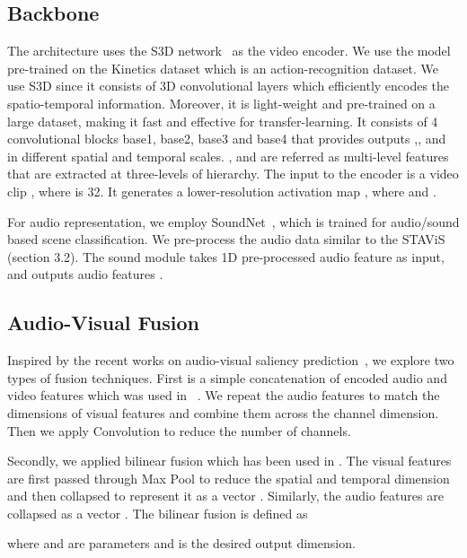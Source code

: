 \documentclass[letterpaper, 10 pt, conference]{ieeeconf}  \usepackage{times}
\begin{document}
\subsection{Backbone}
The architecture uses the S3D network~\cite{xie2018rethinking} as the video encoder. We use the model pre-trained on the Kinetics dataset which is an action-recognition dataset. We use S3D since it consists of 3D convolutional layers which efficiently encodes the spatio-temporal information. Moreover, it is light-weight and pre-trained on a large dataset, making it fast and effective for transfer-learning. It consists of 4 convolutional blocks base1, base2, base3 and base4 that provides outputs ,, and  in different spatial and temporal scales. , and  are referred as multi-level features that are extracted at three-levels of hierarchy. The input to the encoder is a video clip , where  is 32. It generates a lower-resolution activation map , where  and .

For audio representation, we employ SoundNet~\cite{aytar2016soundnet}, which is trained for audio/sound based scene classification. We pre-process the audio data similar to the STAViS~\cite{tsiami2020stavis} (section 3.2). The sound module takes 1D pre-processed audio feature as input,  and outputs audio features .  


\subsection{Audio-Visual Fusion}
Inspired by the recent works on audio-visual saliency prediction~\cite{tsiami2020stavis,tavakoli2019dave}, we explore two types of fusion techniques. First is a simple concatenation of encoded audio and video features which was used in ~\cite{tavakoli2019dave}. We repeat the audio features to match the dimensions of visual features and combine them across the channel dimension. Then we apply  Convolution to reduce the number of channels.

Secondly, we applied bilinear fusion which has been used in \cite{tsiami2020stavis}. The visual features are first passed through Max Pool to reduce the spatial and temporal dimension and then collapsed to represent it as a vector . Similarly, the audio features are collapsed as a vector . The bilinear fusion is defined as 

where  and  are parameters and  is the desired output dimension. 
\end{document}
